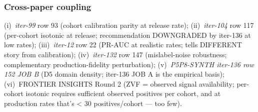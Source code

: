 \subsubsection{Cross-paper coupling}

(i)~\textit{iter-99} row 93 (cohort calibration parity at release rate); (ii)~\textit{iter-104} row 117
(per-cohort isotonic at release; recommendation DOWNGRADED by iter-136 at low rates);
(iii)~\textit{iter-12} row 22 (PR-AUC at realistic rates; tells DIFFERENT story from calibration);
(iv)~\textit{iter-132} row 147 (mislabel-noise robustness; complementary production-fidelity perturbation);
(v)~\textit{P5P8-SYNTH iter-136 row 152 JOB B} (D5 domain density; iter-136 JOB A is the empirical basis);
(vi)~FRONTIER INSIGHTS Round 2 (ZVF = observed signal availability; per-cohort isotonic requires sufficient
observed positives per cohort, and at production rates that's < 30 positives/cohort --- too few).
